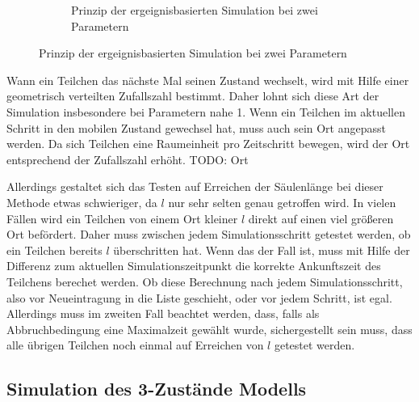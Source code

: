 \begin{figure}
\begin{subfigure}[t]{0.45\textwidth}

\label{2p_by_event}
\caption{Prinzip der ergeignisbasierten Simulation bei zwei Parametern} 
\end{subfigure}
\end{figure}
Wann ein Teilchen das nächste Mal seinen Zustand wechselt, wird mit Hilfe einer geometrisch verteilten Zufallszahl bestimmt. Daher lohnt sich diese Art der Simulation insbesondere bei Parametern nahe 1. 
Wenn ein Teilchen im aktuellen Schritt in den mobilen Zustand gewechsel hat, muss auch sein Ort angepasst werden. Da sich Teilchen eine Raumeinheit pro Zeitschritt bewegen, wird der Ort entsprechend der Zufallszahl erhöht.
TODO: Ort

Allerdings gestaltet sich das Testen auf Erreichen der Säulenlänge bei dieser Methode etwas schwieriger, da $l$ nur sehr selten genau getroffen wird. In vielen Fällen wird ein Teilchen von einem Ort kleiner $l$ direkt auf einen viel größeren Ort befördert. Daher muss zwischen jedem Simulationsschritt getestet werden, ob ein Teilchen bereits $l$ überschritten hat. Wenn das der Fall ist, muss mit Hilfe der Differenz zum aktuellen Simulationszeitpunkt die korrekte Ankunftszeit des Teilchens berechet werden.
Ob diese Berechnung nach jedem Simulationsschritt, also vor Neueintragung in die Liste geschieht, oder vor jedem Schritt, ist egal. Allerdings muss im zweiten Fall beachtet werden, dass, falls als Abbruchbedingung eine Maximalzeit gewählt wurde, sichergestellt sein muss, dass alle übrigen Teilchen noch einmal auf Erreichen von $l$ getestet werden.



\subsection{Simulation des 3-Zustände Modells}


